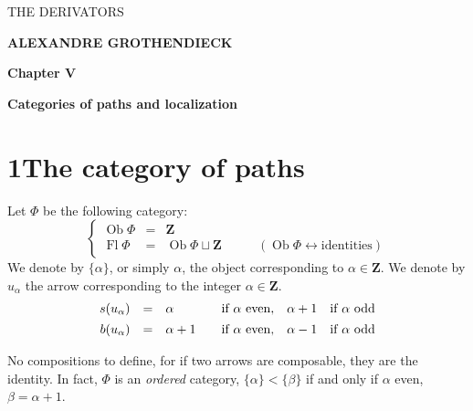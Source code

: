 \documentclass[11pt]{article}
\newcommand{\printedpage}[1]{\marginpar{\footnotesize p.~#1}}
\newcommand{\msp}[1]{\marginpar{\footnotesize [#1]}}
\newcommand{\Ob}{\operatorname{Ob}}
\newcommand{\Fl}{\operatorname{Fl}}
\begin{document}
\printedpage{}

\begin{center}
\vspace*{6cm}

{\LARGE\textsf{THE DERIVATORS}}

\vspace{1.5cm}

{\large\textbf{ALEXANDRE GROTHENDIECK}}

\vspace{2.5cm}

{\large\textbf{Chapter V}}

\vspace{0.4cm}

{\large\textbf{Categories of paths and localization}}
\end{center}

\clearpage


\printedpage{1}

\msp{page 1}

\section*{1\quad The category of paths}

Let $\Phi$ be the following category:
\[
\left\{
\begin{array}{rcll}
\Ob\Phi & = & \mathbf{Z} & \\
\Fl\Phi & = & \Ob\Phi\sqcup\mathbf{Z} & \qquad (\Ob\Phi\leftrightarrow\text{identities})
\end{array}
\right.
\]
We denote by $\{\alpha\}$, or simply $\alpha$, the object corresponding to $\alpha\in\mathbf{Z}$. We denote by $u_\alpha$ the arrow corresponding to the integer $\alpha\in\mathbf{Z}$.
\[
\begin{array}{rcl@{\qquad}l@{\quad}l@{\quad}l}
s(u_\alpha) & = & \alpha & \text{if } \alpha \text{ even}, & \alpha+1 & \text{if } \alpha \text{ odd}\\[1ex]
b(u_\alpha) & = & \alpha+1 & \text{if } \alpha \text{ even}, & \alpha-1 & \text{if } \alpha \text{ odd}
\end{array}
\]

No compositions to define, for if two arrows are composable, they are the identity. In fact, $\Phi$ is an \textit{ordered} category, $\{\alpha\}<\{\beta\}$ if and only if $\alpha$ even, $\beta=\alpha+1$. %
\end{document}
